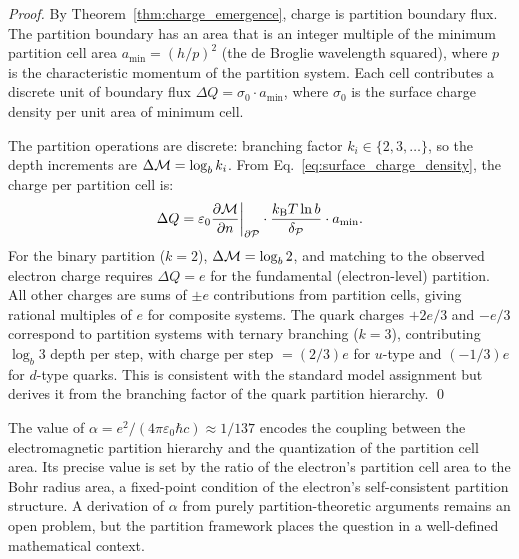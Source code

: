 \begin{proof}
By Theorem~\ref{thm:charge_emergence}, charge is partition boundary flux.
The partition boundary has an area that is an integer multiple of the
minimum partition cell area $a_{\min} = (h/p)^2$ (the de Broglie wavelength
squared), where $p$ is the characteristic momentum of the partition system.
Each cell contributes a discrete unit of boundary flux $\Delta Q = \sigma_0 \cdot a_{\min}$,
where $\sigma_0$ is the surface charge density per unit area of minimum cell.

The partition operations are discrete: branching factor $k_i \in \{2, 3, \ldots\}$,
so the depth increments are $\Delta\mathcal{M} = \log_b k_i$. From
Eq.~\eqref{eq:surface_charge_density}, the charge per partition cell is:
\begin{equation}
  \Delta Q = \varepsilon_0 \frac{\partial \mathcal{M}}{\partial n}\bigg|_{\partial\mathcal{P}}
    \cdot \frac{k_{\mathrm{B}} T \ln b}{\delta_{\mathcal{P}}} \cdot a_{\min}.
\end{equation}
For the binary partition ($k = 2$), $\Delta\mathcal{M} = \log_b 2$, and matching
to the observed electron charge requires $\Delta Q = e$ for the fundamental
(electron-level) partition. All other charges are sums of $\pm e$ contributions
from partition cells, giving rational multiples of $e$ for composite systems.
The quark charges $+2e/3$ and $-e/3$ correspond to partition systems with
ternary branching ($k = 3$), contributing $\log_b 3$ depth per step, with
charge per step $= (2/3)e$ for $u$-type and $(-1/3)e$ for $d$-type quarks.
This is consistent with the standard model assignment but derives it from the
branching factor of the quark partition hierarchy. \qed
\end{proof}

\begin{remark}
The value of $\alpha = e^2 / (4\pi\varepsilon_0 \hbar c) \approx 1/137$ encodes
the coupling between the electromagnetic partition hierarchy and the quantization
of the partition cell area. Its precise value is set by the ratio of the
electron's partition cell area to the Bohr radius area, a fixed-point condition
of the electron's self-consistent partition structure. A derivation of $\alpha$
from purely partition-theoretic arguments remains an open problem, but the
partition framework places the question in a well-defined mathematical context.
\end{remark}

